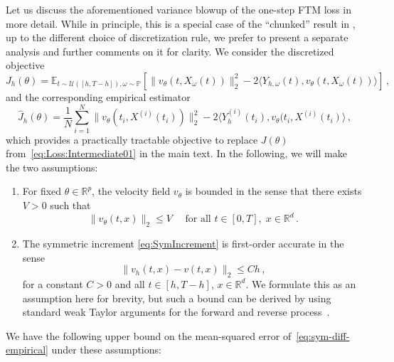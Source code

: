\documentclass[oneside,11pt]{article}
\theoremstyle{remark}
\begin{document}
Let us discuss the aforementioned variance blowup of the one-step FTM loss in more detail. While in principle, this is a special case of the ``chunked'' result in , up to the different choice of discretization rule, we prefer to present a separate analysis and further comments on it for clarity. We consider the discretized objective
\begin{equation*}
    J_h(\theta) = \mathbb{E}_{t \sim \mathcal{U}([h, T-h]), \omega \sim \mathbb{P}} \left[\|v_{\theta}(t, X_\omega(t))\|^2_2 - 2 \langle Y_{h,\omega}(t) , v_{\theta}(t, X_\omega(t))\rangle\right]\,,
\end{equation*}
and the corresponding empirical estimator
\begin{equation}\label{eq:sym-diff-empirical}
\widehat{J}_h(\theta) = \frac{1}{N}\sum_{i = 1}^N \|v_{\theta}(t_i, X^{(i)}(t_i))\|_2^2 - 2 \langle Y^{(i)}_h(t_i), v_{\theta}(t_i, X^{(i)}(t_i)\rangle\,,
\end{equation}
which provides a practically tractable objective to replace $J(\theta)$ from~\eqref{eq:Loss:Intermediate01} in the main text.
In the following, we will make the two assumptions:
\begin{enumerate}
    \item For fixed $\theta \in \mathbb{R}^p$, the velocity field $v_{\theta}$ is bounded in the sense that there exists $V > 0$ such that 
\begin{equation*}
\|v_{\theta}(t, x)\|_2 \leq V \quad \text{ for all } t \in [0,T], \; x \in \mathbb{R}^d\,.
\end{equation*}
    \item The symmetric increment \eqref{eq:SymIncrement} is first-order accurate in the sense
\begin{equation} \label{eq:AsmFirstOrderAccurate}
\|v_h(t, x) - v(t, x)\|_2 \leq C h\,,
\end{equation}
for a constant $C > 0$ and all $t \in [h, T - h]$, $x \in \mathbb{R}^d$. We formulate this as an assumption here for brevity, but such a bound can be derived by using standard weak Taylor arguments for the forward and reverse process~\cite{kloeden-platen:1992}.
\end{enumerate}
We have the following upper bound on the mean-squared error of~\eqref{eq:sym-diff-empirical} under these assumptions:
\end{document}
